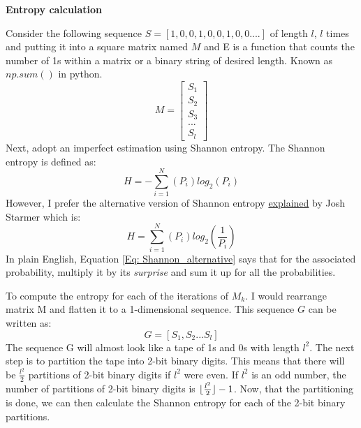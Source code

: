 \textbf{\Large{Entropy calculation}} \par

\vspace{0.4cm}
Consider the following sequence $S=[1,0,0,1,0,0,1,0,0....]$ of length $l$, $l$ times and putting it into a square matrix named $M$ and E is a function that counts the number of 1s within a matrix or a binary string of desired length. Known as $np.sum()$ in python. 
$$M=\begin{bmatrix}
S_{1} \\
S_{2}\\
S_{3}\\
... \\
S_{l}
\end{bmatrix}$$
Next, adopt an imperfect estimation using Shannon entropy. The Shannon entropy is defined as: 
\begin{equation}
    H=-\sum_{i=1}^{N} (P_{i})log_2(P_{i})
    \label{Eq:Shannon}
\end{equation}
However, I prefer the alternative version of Shannon entropy \href{https://www.youtube.com/watch?v=YtebGVx-Fxw}{explained} by Josh Starmer which is: 
\begin{equation}
    H=\sum_{i=1}^{N} (P_{i})log_{2}(\frac{1}{P_{i}})
    \label{Eq: Shannon_alternative}
\end{equation}
In plain English, Equation \ref{Eq: Shannon_alternative} says that for the associated probability, multiply it by its \emph{surprise} and sum it up for all the probabilities. \par

\vspace{0.3cm}
To compute the entropy for each of the iterations of $M_{k}$. I would rearrange matrix M and flatten it to a 1-dimensional sequence. This sequence $G$ can be written as:
$$G=[S_{1}, S_{2}...S_{l}]$$
The sequence G will almost look like a tape of 1s and 0s with length $l^{2}$. The next step is to partition the tape into 2-bit binary digits. This means that there will be $\frac{l^{2}}{2}$ partitions of 2-bit binary digits if $l^{2}$ were even. If $l^{2}$ is an odd number, the number of partitions of 2-bit binary digits is $ \lfloor\frac{l^{2}}{2}\rfloor-1$. Now, that the partitioning is done, we can then calculate the Shannon entropy for each of the 2-bit binary partitions. \par

